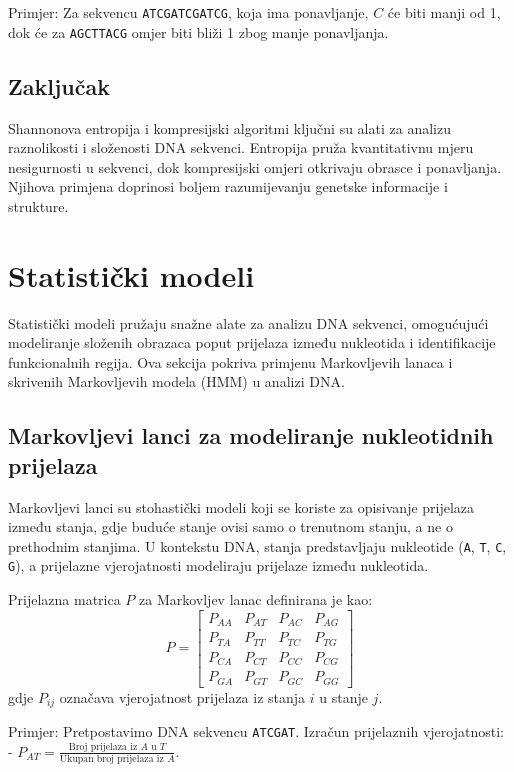 \documentclass[10pt,a4paper,twoside]{article}
\begin{document}
Primjer: Za sekvencu \texttt{ATCGATCGATCG}, koja ima ponavljanje, \( C \) će biti manji od 1, dok će za \texttt{AGCTTACG} omjer biti bliži 1 zbog manje ponavljanja.

\subsection*{Zaključak}

Shannonova entropija i kompresijski algoritmi ključni su alati za analizu raznolikosti i složenosti DNA sekvenci. Entropija pruža kvantitativnu mjeru nesigurnosti u sekvenci, dok kompresijski omjeri otkrivaju obrasce i ponavljanja. Njihova primjena doprinosi boljem razumijevanju genetske informacije i strukture.
	
\section*{Statistički modeli}

Statistički modeli pružaju snažne alate za analizu DNA sekvenci, omogućujući modeliranje složenih obrazaca poput prijelaza između nukleotida i identifikacije funkcionalnih regija. Ova sekcija pokriva primjenu Markovljevih lanaca i skrivenih Markovljevih modela (HMM) u analizi DNA.

\subsection*{Markovljevi lanci za modeliranje nukleotidnih prijelaza}

Markovljevi lanci su stohastički modeli koji se koriste za opisivanje prijelaza između stanja, gdje buduće stanje ovisi samo o trenutnom stanju, a ne o prethodnim stanjima. U kontekstu DNA, stanja predstavljaju nukleotide (\texttt{A}, \texttt{T}, \texttt{C}, \texttt{G}), a prijelazne vjerojatnosti modeliraju prijelaze između nukleotida.

Prijelazna matrica \( P \) za Markovljev lanac definirana je kao:
\[
P = 
\begin{bmatrix}
	P_{AA} & P_{AT} & P_{AC} & P_{AG} \\
	P_{TA} & P_{TT} & P_{TC} & P_{TG} \\
	P_{CA} & P_{CT} & P_{CC} & P_{CG} \\
	P_{GA} & P_{GT} & P_{GC} & P_{GG}
\end{bmatrix}
\]
gdje \( P_{ij} \) označava vjerojatnost prijelaza iz stanja \( i \) u stanje \( j \).

Primjer: Pretpostavimo DNA sekvencu \texttt{ATCGAT}. Izračun prijelaznih vjerojatnosti:
- \( P_{AT} = \frac{\text{Broj prijelaza iz } A \text{ u } T}{\text{Ukupan broj prijelaza iz } A} \).
\end{document}
